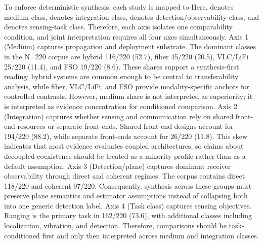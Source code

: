 {}
\markdownRendererSectionEnd \markdownRendererSectionBegin
{}\markdownRendererInterblockSeparator
{}To enforce deterministic synthesis, each study  is mapped to\markdownRendererSoftLineBreak
{}\markdownRendererSoftLineBreak
{}Here,  denotes medium class,  denotes integration class,  denotes detection/observability class, and  denotes sensing-task class. Therefore, each axis isolates one comparability condition, and joint interpretation requires all four axes simultaneously.\markdownRendererParagraphSeparator
{}Axis 1 (Medium) captures propagation and deployment substrate. The dominant classes in the N=220 corpus are hybrid 116/220 (52.7\markdownRendererPercentSign{}), fiber 45/220 (20.5\markdownRendererPercentSign{}), VLC/LiFi 25/220 (11.4\markdownRendererPercentSign{}), and FSO 19/220 (8.6\markdownRendererPercentSign{}). These shares support a synthesis-first reading: hybrid systems are common enough to be central to transferability analysis, while fiber, VLC/LiFi, and FSO provide modality-specific anchors for controlled contrasts. However, medium share is not interpreted as superiority; it is interpreted as evidence concentration for conditioned comparison.\markdownRendererParagraphSeparator
{}Axis 2 (Integration) captures whether sensing and communication rely on shared front-end resources or separate front-ends. Shared front-end designs account for 194/220 (88.2\markdownRendererPercentSign{}), while separate front-ends account for 26/220 (11.8\markdownRendererPercentSign{}). This skew indicates that most evidence evaluates coupled architectures, so claims about decoupled coexistence should be treated as a minority profile rather than as a default assumption.\markdownRendererParagraphSeparator
{}Axis 3 (Detection/plane) captures dominant receiver observability through direct and coherent regimes. The corpus contains direct 118/220 and coherent 97/220. Consequently, synthesis across these groups must preserve plane semantics and estimator assumptions instead of collapsing both into one generic detection label.\markdownRendererParagraphSeparator
{}Axis 4 (Task class) captures sensing objectives. Ranging is the primary task in 162/220 (73.6\markdownRendererPercentSign{}), with additional classes including localization, vibration, and detection. Therefore, comparisons should be task-conditioned first and only then interpreted across medium and integration classes.\markdownRendererParagraphSeparator
